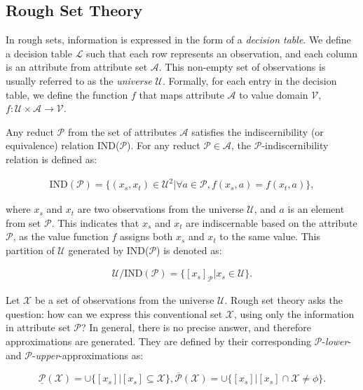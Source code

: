 \subsection{Rough Set Theory}
In rough sets, information is expressed in the form of a \emph{decision table}. We define a decision table $\mathcal{L}$ such that each row represents an observation, and each column is an attribute from attribute set  $\mathcal{A}$. This non-empty set of observations is usually referred to as the \emph{universe} $\mathcal{U}$.
Formally, for each entry in the decision table, we define the function $f$ that maps attribute $\mathcal{A}$ to value domain $\mathcal{V}$, $f: \mathcal{U} \times \mathcal{A} \rightarrow \mathcal{V}$.

Any reduct $\mathcal{P}$ from the set of attributes $\mathcal{A}$ satisfies the indiscernibility (or  equivalence) relation IND($\mathcal{P}$). For any reduct $\mathcal{P} \in \mathcal{A}$, the $\mathcal{P}$-indiscernibility relation is defined as:

\begin{align}
\label{eq:p-ind}
\mbox{IND}(\mathcal{P}) = \{(x_s,x_t) \in \mathcal{U}^2 | \forall a \in \mathcal{P}, f(x_s,a) = f(x_t,a)\},
\end{align}

where $x_s$ and $x_t$ are two observations from the universe $\mathcal{U}$, and $a$ is an element from set $\mathcal{P}$. This indicates that $x_s$ and $x_t$ are indiscernable based on the attribute $\mathcal{P}$, as the value function $f$ assigns both $x_s$ and $x_t$ to the same value. This partition of $\mathcal{U}$ generated by IND($\mathcal{P}$) is denoted as:

\begin{align}
\label{eq:p-part}
\mathcal{U}/\mbox{IND}(\mathcal{P}) = \{[x_s]_{\mathcal{P}} | x_s \in \mathcal{U}\}.
\end{align}

Let $\mathcal{X}$ be a set of observations from the universe $\mathcal{U}$. Rough set theory asks the question: how can we express this conventional set $\mathcal{X}$, using only the information in attribute set $\mathcal{P}$? In general, there is no precise answer, and therefore approximations are generated. They are defined by their corresponding $\mathcal{P}$-\emph{lower}- and $\mathcal{P}$-\emph{upper}-approximations as:


\begin{subequations}
\label{eq:low-upp}
\begin{equation}
\underline{\mathcal{P}}(\mathcal{X}) = \cup \{[x_s] | [x_s] \subseteq \mathcal{X}\},
\end{equation}    
\begin{equation}
\overline{\mathcal{P}}(\mathcal{X}) = \cup \{[x_s] | [x_s] \cap \mathcal{X} \neq \phi\}.
\end{equation}
\end{subequations}

